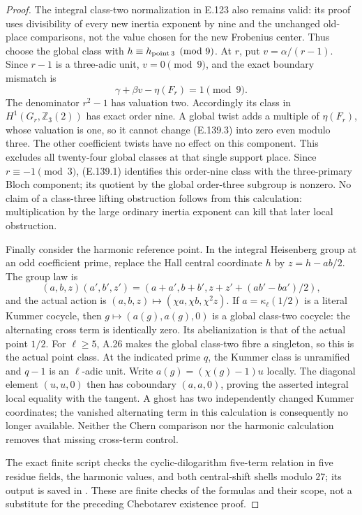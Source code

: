 \begin{proof}
The integral class-two normalization in E.123 also remains valid:
its proof uses divisibility of every new inertia exponent by nine
and the unchanged old-place comparisons, not the value chosen
for the new Frobenius center. Thus choose the global class with
$h\equiv h_{\rm point\,3}\pmod9$.
At $r$, put $v=\alpha/(r-1)$. Since $r-1$ is a three-adic
unit, $v=0\pmod9$, and the exact boundary mismatch is
\[
       \gamma+\beta v-\eta(F_r)=1\pmod9.
 \tag{E.139.3}
\]
The denominator $r^2-1$ has valuation two. Accordingly its class
in $H^1(G_r,\mathbb Z_3(2))$ has exact order nine.
A global twist adds a multiple of $\eta(F_r)$, whose valuation
is one, so it cannot change (E.139.3) into zero even modulo
three. The other coefficient twists have no effect on this
component. This excludes all twenty-four global classes at
that single support place. Since $r\equiv-1\pmod3$, (E.139.1)
identifies this order-nine class with the three-primary Bloch
component; its quotient by the global order-three subgroup is
nonzero. No claim of a class-three lifting obstruction follows
from this calculation: multiplication by the large ordinary
inertia exponent can kill that later local obstruction.

Finally consider the harmonic reference point. In the integral
Heisenberg group at an odd coefficient prime, replace the Hall
central coordinate $h$ by $z=h-ab/2$. The group law is
\[
 (a,b,z)(a',b',z')=
 (a+a',b+b',z+z'+(ab'-ba')/2),
\]
and the actual action is $(a,b,z)\mapsto(\chi a,\chi b,\chi^2z)$.
If $a=\kappa_\ell(1/2)$ is a literal Kummer cocycle, then
$g\mapsto(a(g),a(g),0)$ is a global class-two cocycle: the
alternating cross term is identically zero. Its abelianization
is that of the actual point $1/2$. For $\ell\ge5$, A.26 makes
the global class-two fibre a singleton, so this is the actual
point class. At the indicated prime $q$, the Kummer class is
unramified and $q-1$ is an $\ell$-adic unit. Write
$a(g)=(\chi(g)-1)u$ locally. The diagonal element $(u,u,0)$
then has coboundary $(a,a,0)$, proving the asserted integral
local equality with the tangent. A ghost has two independently
changed Kummer coordinates; the vanished alternating term in
this calculation is consequently no longer available. Neither
the Chern comparison nor the harmonic calculation removes that
missing cross-term control.

The exact finite script 
checks the cyclic-dilogarithm five-term relation in five residue
fields, the harmonic values, and both central-shift shells modulo
$27$; its output is saved in .
These are finite checks of the formulas and their scope, not a
substitute for the preceding Chebotarev existence proof.
\end{proof}
